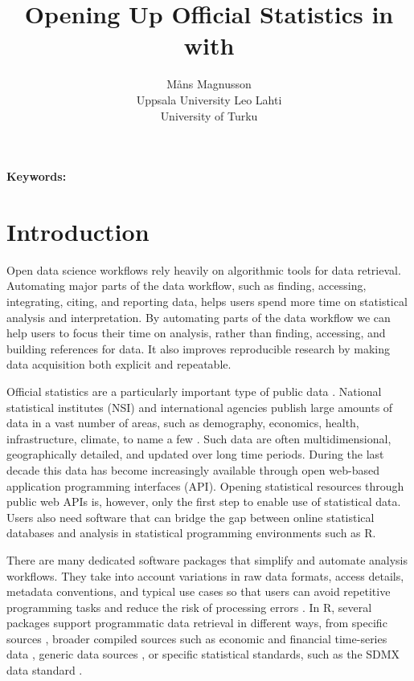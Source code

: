 \documentclass[11pt]{article}
\author{M\r{a}ns Magnusson\\Uppsala University \And
        Leo Lahti\\University of Turku}
\title{Opening Up Official Statistics in \proglang{R} with \pkg{pxweb}}
\date{}
\DeclareRobustCommand{\proglang}[1]{\textsf{#1}}
\newcommand{\printfrontmatter}{%
  \maketitle
  \begin{abstract}
  \articleabstract
  \end{abstract}
  \noindent\textbf{Keywords:} \articlekeywords\par\bigskip
}
\begin{document}
\printfrontmatter



\section{Introduction}

Open data science workflows rely heavily on algorithmic tools for data retrieval.
Automating major parts of the data workflow, such as finding, accessing, integrating, citing, and reporting data, helps users spend more time on statistical analysis and interpretation.
By automating parts of the data workflow we can help users to focus their time on analysis, rather than finding, accessing, and building references for data.
It also improves reproducible research \citep{Gandrud13, Boettiger2015} by making data acquisition both explicit and repeatable.

Official statistics are a particularly important type of public data \citep{UNGA_2014_FPOS}.
National statistical institutes (NSI) and international agencies publish large amounts of data in a vast number of areas, such as demography, economics, health, infrastructure, climate, to name a few \citep{UNGA_2014_FPOS,WorldBank_WDI}.
Such data are often multidimensional, geographically detailed, and updated over long time periods.
During the last decade this data has become increasingly available through open web-based application programming interfaces (API).
Opening statistical resources through public web APIs is, however, only the first step to enable use of statistical data.
Users also need software that can bridge the gap between online statistical databases and analysis in statistical programming environments such as \proglang{R}.

There are many dedicated software packages that simplify and automate analysis workflows.
They take into account variations in raw data formats, access details, metadata conventions, and typical use cases so that users can avoid repetitive programming tasks and reduce the risk of processing errors \citep{GrovesLyberg2010}.
In \proglang{R}, several packages support programmatic data retrieval in different ways, from specific sources \citep{Lahti17eurostat, osmar, WDI}, broader compiled sources such as economic and financial time-series data \citep{pdfetch}, generic data sources \citep{szocs2020webchem, caro2017intsvy}, or specific statistical standards, such as the SDMX data standard \citep{rsdmx}.
\end{document}
